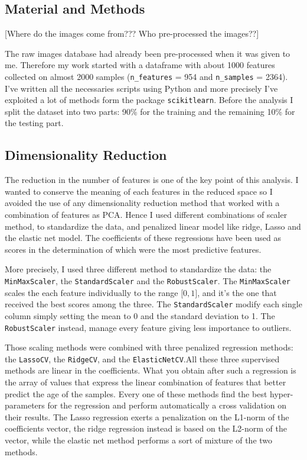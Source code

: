 \documentclass[11pt,a4paper]{report}
\begin{document}
\subsection*{Material and Methods}
[Where do the images come from??? Who pre-processed the images??]

The raw images database had already been pre-processed when it was given to me. Therefore my work started with a dataframe with about 1000 features collected on almost 2000 samples (\texttt{n\_features} = 954 and \texttt{n\_samples} = 2364). I've written all the necessaries scripts using Python and more precisely I've exploited a lot of methods form the package \texttt{scikitlearn}. Before the analysis I split the dataset into two parts: 90\% for the training and the remaining 10\% for the testing part.

\subsection*{Dimensionality Reduction}
The reduction in the number of features is one of the key point of this analysis. I wanted to conserve the meaning of each features in the reduced space so I avoided the use of any dimensionality reduction method that worked with a combination of features as PCA. Hence I used different combinations of scaler method, to standardize the data, and penalized linear model like ridge, Lasso and the elastic net model. The coefficients of these regressions have been used as scores in the determination of which were the most predictive features.

More precisely, I used three different method to standardize the data: the \texttt{MinMaxScaler}, the \texttt{StandardScaler} and the \texttt{RobustScaler}. The \texttt{MinMaxScaler} scales the each feature individually to the range $\lbrack 0,1 \rbrack$, and it's the one that received the best scores among the three. The \texttt{StandardScaler} modify each single column simply setting the mean to 0 and the standard deviation to 1. The \texttt{RobustScaler} instead, manage every feature giving less importance to outliers.

Those scaling methods were combined with three penalized regression methods: the \texttt{LassoCV}, the \texttt{RidgeCV}, and the \texttt{ElasticNetCV}.All these three supervised methods are linear in the coefficients. What you obtain after such a regression is the array of values that express the linear combination of features that better predict the age of the samples. Every one of these methods find the best hyper-parameters for the regression and perform automatically a cross validation on their results.  The Lasso regression exerts a penalization on the L1-norm of the coefficients vector, the ridge regression instead is based on the L2-norm of the vector, while the elastic net method performs a sort of mixture of the two methods.
\end{document}
